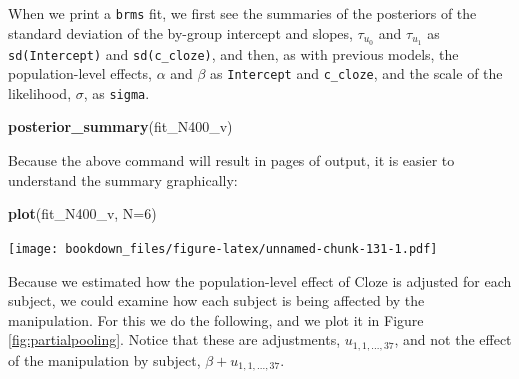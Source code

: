 \documentclass[12pt,]{krantz}
\newenvironment{Shaded}{\begin{snugshade}}{\end{snugshade}}
\newcommand{\DataTypeTok}[1]{\textcolor[rgb]{0.13,0.29,0.53}{#1}}
\newcommand{\DecValTok}[1]{\textcolor[rgb]{0.00,0.00,0.81}{#1}}
\newcommand{\KeywordTok}[1]{\textcolor[rgb]{0.13,0.29,0.53}{\textbf{#1}}}
\newcommand{\NormalTok}[1]{#1}
\theoremstyle{definition}
\theoremstyle{definition}
\theoremstyle{definition}
\theoremstyle{remark}
\begin{document}
When we print a \texttt{brms} fit, we first see the summaries of the posteriors of the standard deviation of the by-group intercept and slopes, \(\tau_{u_0}\) and \(\tau_{u_1}\) as \texttt{sd(Intercept)} and \texttt{sd(c\_cloze)}, and then, as with previous models, the population-level effects, \(\alpha\) and \(\beta\) as \texttt{Intercept} and \texttt{c\_cloze}, and the scale of the likelihood, \(\sigma\), as \texttt{sigma}.

\begin{Shaded}
\begin{Highlighting}[]
\KeywordTok{posterior_summary}\NormalTok{(fit_N400_v)}
\end{Highlighting}
\end{Shaded}

Because the above command will result in pages of output,
it is easier to understand the summary graphically:

\begin{Shaded}
\begin{Highlighting}[]
\KeywordTok{plot}\NormalTok{(fit_N400_v, }\DataTypeTok{N=}\DecValTok{6}\NormalTok{)}
\end{Highlighting}
\end{Shaded}

\texttt{[image: bookdown\_files/figure-latex/unnamed-chunk-131-1.pdf]}

Because we estimated how the population-level effect of Cloze is adjusted for each subject, we could examine how each subject is being affected by the manipulation. For this we do the following, and we plot it in Figure \ref{fig:partialpooling}. Notice that these are adjustments, \(u_{1,1,...,37}\), and not the effect of the manipulation by subject, \(\beta + u_{1,1,...,37}\).
\end{document}
